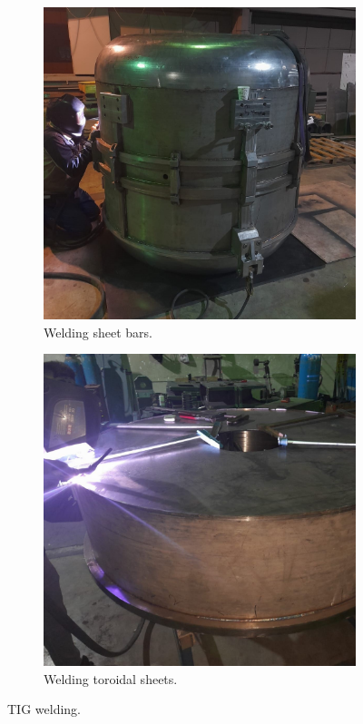 \documentclass[a4paper,oneside,12pt]{report}
\numberwithin{equation}{chapter}
\begin{document}
\begin{figure}
    \captionsetup[subfigure]{justification=centering}
    \captionsetup{justification=centering}
    \centering
    \begin{subfigure}{.5\textwidth}
      \centering
      \includegraphics[width=.96\linewidth]{./figures/manif/welding/rhodo_assembled_welding_cropped.jpeg}
      \caption{Welding sheet bars.}
    \end{subfigure}%
    \centering
    \begin{subfigure}{.5\textwidth}
      \centering
      \includegraphics[width=.96\linewidth]{./figures/manif/welding/rhodo_middle_welding_toroidal_sheets_cropped.jpeg}
      \caption{Welding toroidal sheets.}
    \end{subfigure}
    \caption{TIG welding.}
    \label{fig:manif_welding}
\end{figure}
\end{document}
